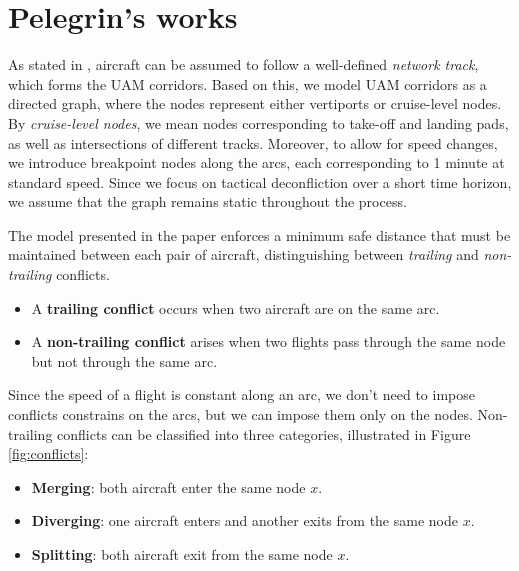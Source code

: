 \documentclass[../../thesis.tex]{subfiles}
\begin{document}
\section{Pelegrin's works}

As stated in \cite{pelegrin-2023}, aircraft can be assumed to follow a well-defined \textit{network track}, which forms the UAM corridors.
Based on this, we model UAM corridors as a directed graph, where the nodes represent either vertiports or cruise-level nodes.
By \textit{cruise-level nodes}, we mean nodes corresponding to take-off and landing pads, as well as intersections of different tracks.
Moreover, to allow for speed changes, we introduce breakpoint nodes along the arcs, each corresponding to 1 minute at standard speed.
Since we focus on tactical deconfliction over a short time horizon, we assume that the graph remains static throughout the process.

The model presented in the paper enforces a minimum safe distance that must be maintained between each pair of aircraft, distinguishing between \textit{trailing} and \textit{non-trailing} conflicts.  
\begin{itemize}
    \item A \textbf{trailing conflict} occurs when two aircraft are on the same arc.%
    \item A \textbf{non-trailing conflict} arises when two flights pass through the same node but not through the same arc. 
\end{itemize}  

Since the speed of a flight is constant along an arc, we don't need to impose conflicts constrains on the arcs, but we can impose them only on the nodes.
Non-trailing conflicts can be classified into three categories, illustrated in Figure \ref{fig:conflicts}:  
\begin{itemize}
    \item \textbf{Merging}: both aircraft enter the same node $x$.  
    \item \textbf{Diverging}: one aircraft enters and another exits from the same node $x$.  
    \item \textbf{Splitting}: both aircraft exit from the same node $x$.  
\end{itemize}  
\end{document}

